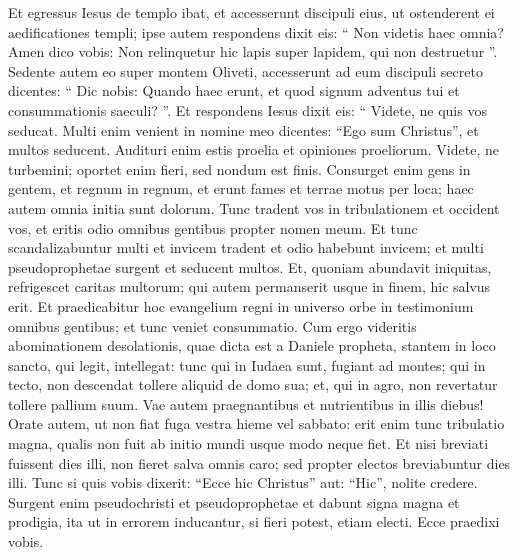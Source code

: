 \begin{biblechapter}
\begin{biblechapter}
\begin{biblechapter}
\begin{biblechapter}
\begin{biblechapter}
\begin{biblechapter}
\begin{biblechapter}
\begin{biblechapter}
\begin{biblechapter}
\begin{biblechapter}
\begin{biblechapter}
\begin{biblechapter}
\begin{biblechapter}
\begin{biblechapter}
\begin{biblechapter}
\begin{biblechapter}
\begin{biblechapter}
\begin{biblechapter}
\begin{biblechapter}
\begin{biblechapter}
\begin{biblechapter}
\begin{biblechapter}
\begin{biblechapter}
\begin{biblechapter}
\verse Et egressus Iesus de templo ibat, et accesserunt discipuli eius, ut ostenderent ei aedificationes templi; 
\verse ipse autem respondens dixit eis: “ Non videtis haec omnia? Amen dico vobis: Non relinquetur hic lapis super lapidem, qui non destruetur ”. 
\verse Sedente autem eo super montem Oliveti, accesserunt ad eum discipuli secreto dicentes: “ Dic nobis: Quando haec erunt, et quod signum adventus tui et consummationis saeculi? ”.
 \verse Et respondens Iesus dixit eis: “ Videte, ne quis vos seducat. 
\verse Multi enim venient in nomine meo dicentes: “Ego sum Christus”, et multos seducent. 
\verse Audituri enim estis proelia et opiniones proeliorum. Videte, ne turbemini; oportet enim fieri, sed nondum est finis. 
\verse Consurget enim gens in gentem, et regnum in regnum, et erunt fames et terrae motus per loca; 
\verse haec autem omnia initia sunt dolorum. 
\verse Tunc tradent vos in tribulationem et occident vos, et eritis odio omnibus gentibus propter nomen meum. 
\verse Et tunc scandalizabuntur multi et invicem tradent et odio habebunt invicem; 
\verse et multi pseudoprophetae surgent et seducent multos. 
\verse Et, quoniam abundavit iniquitas, refrigescet caritas multorum; 
\verse qui autem permanserit usque in finem, hic salvus erit. 
\verse Et praedicabitur hoc evangelium regni in universo orbe in testimonium omnibus gentibus; et tunc veniet consummatio. 
\verse Cum ergo videritis abominationem desolationis, quae dicta est a Daniele propheta, stantem in loco sancto, qui legit, intellegat: 
\verse tunc qui in Iudaea sunt, fugiant ad montes; 
\verse qui in tecto, non descendat tollere aliquid de domo sua; 
\verse et, qui in agro, non revertatur tollere pallium suum. 
\verse Vae autem praegnantibus et nutrientibus in illis diebus!
 \verse Orate autem, ut non fiat fuga vestra hieme vel sabbato: 
\verse erit enim tunc tribulatio magna, qualis non fuit ab initio mundi usque modo neque fiet. 
\verse Et nisi breviati fuissent dies illi, non fieret salva omnis caro; sed propter electos breviabuntur dies illi. 
\verse Tunc si quis vobis dixerit: “Ecce hic Christus” aut: “Hic”, nolite credere. 
\verse Surgent enim pseudochristi et pseudoprophetae et dabunt signa magna et prodigia, ita ut in errorem inducantur, si fieri potest, etiam electi. 
\verse Ecce praedixi vobis. 

\end{biblechapter}
\end{biblechapter}
\end{biblechapter}
\end{biblechapter}
\end{biblechapter}
\end{biblechapter}
\end{biblechapter}
\end{biblechapter}
\end{biblechapter}
\end{biblechapter}
\end{biblechapter}
\end{biblechapter}
\end{biblechapter}
\end{biblechapter}
\end{biblechapter}
\end{biblechapter}
\end{biblechapter}
\end{biblechapter}
\end{biblechapter}
\end{biblechapter}
\end{biblechapter}
\end{biblechapter}
\end{biblechapter}
\end{biblechapter}
